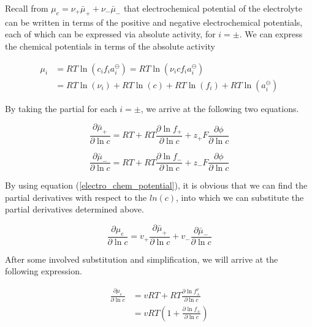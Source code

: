 \documentclass[lettersize,journal]{IEEEtran}
\begin{document}
\noindent Recall from $ \mu_{e}=\nu_{+} \bar{\mu}_{+}+\nu_{-} \bar{\mu}_{-}$ that electrochemical potential of the electrolyte can be written in terms of the positive and negative electrochemical potentials, each of which can be expressed via absolute activity, for $i = \pm$. We can express the chemical potentials in terms of the absolute activity

\begin{equation}
\begin{aligned}
\mu_{i} &=R T \ln \left(c_{i} f_{i} a_{i}^{\ominus}\right)=R T \ln \left(\nu_{i} c f_{i} a_{i}^{\ominus}\right) \\
&=R T \ln \left(\nu_{i}\right)+R T \ln (c)+R T \ln \left(f_{i}\right)+R T \ln \left(a_{i}^{\ominus}\right)
\end{aligned}
\end{equation}

\noindent By taking the partial for each $i = \pm$, we arrive at the following two equations.

\begin{equation}
\frac{\partial \bar{\mu}_{+}}{\partial \ln c}=R T+R T \frac{\partial \ln f_{+}}{\partial \ln c}+z_{+} F \frac{\partial \phi}{\partial \ln c}
\end{equation}

\begin{equation}
\frac{\partial \bar{\mu}_{-}}{\partial \ln c}=R T+R T \frac{\partial \ln f_{-}}{\partial \ln c}+z_{-} F \frac{\partial \phi}{\partial \ln c}
\end{equation}


\noindent By using equation (\ref{electro_chem_potential}), it is obvious that we can find the partial derivatives with respect to the $ln(c)$, into which we can substitute the partial derivatives determined above.

\begin{equation}
\frac{\partial \mu_{e}}{\partial \ln c} =v_{+} \frac{\partial \bar{\mu}_{+}}{\partial \ln c}+v_{-} \frac{\partial \bar{\mu}_{-}}{\partial \ln c}
\end{equation}

\noindent After some involved substitution and simplification, we will arrive at the following expression.

\begin{equation}
\begin{aligned}
\frac{\partial \mu_{e}}{\partial \ln c} &=v R T+R T \frac{\partial \ln f_{\pm}^{\nu}}{\partial \ln c} \\
&=v R T\left(1+\frac{\partial \ln f_{\pm}}{\partial \ln c}\right)
\end{aligned}
\end{equation}
\end{document}
